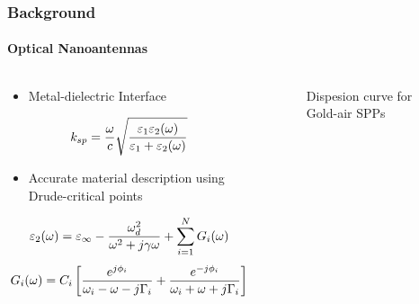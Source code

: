 \documentclass[mathserif,18pt,xcolor=table]{beamer}
\begin{document}
  \begin{frame}
    \frametitle{Background}
    \framesubtitle{Optical Nanoantennas}
    \begin{columns}[T] %
      \begin{column}{.5\textwidth}
        \begin{itemize}
          \item Metal-dielectric Interface
        \end{itemize}
        \begin{equation} \nonumber
          k_{sp}=\frac{\omega}{c}\sqrt {\dfrac {\varepsilon_{1}\varepsilon_{2}(\omega)} {\varepsilon_{1} + \varepsilon_{2}(\omega)}}
          \label{eq:dis_spp}
        \end{equation}
        \begin{itemize}
          \item Accurate material description using Drude-critical points
        \end{itemize}
        \begin{equation} \nonumber
          \varepsilon_2(\omega) = \varepsilon_{\infty} - \frac{\omega_{d}^{2}}{\omega^2 + j\gamma \omega} + \sum \limits_{i = 1}^N G_i(\omega)
          \label{eq:eps_drude_cp}
        \end{equation}
        \begin{equation} \nonumber
          G_i(\omega) = C_i \left[ \frac{e^{j \phi_i}}{\omega_i - \omega - j \Gamma_i} + \frac{e^{-j \phi_i}}{\omega_i + \omega + j \Gamma_i} \right]
          \label{eq:CP_terms}
        \end{equation}
      \end{column}
      \begin{column}[T]{.5\textwidth}
        \begin{figure}
          \vspace*{-2cm}
          
          \label{fig:ep_gold}
          \caption{Dispesion curve for Gold-air SPPs}
        \end{figure}
        \begin{figure}
          \vspace*{-1cm}
          
          \label{fig:disp_gold}
        \end{figure}
      \end{column}
    \end{columns}
  \end{frame}
\end{document}
